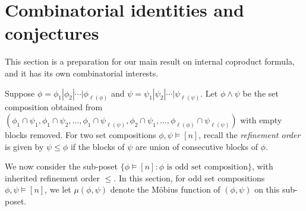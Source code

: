\documentclass[11pt]{amsart}
\newtheorem{Theorem}{Theorem}[section]
\newtheorem{Lemma}[Theorem]{Lemma}
\numberwithin{equation}{section}
\newcommand{\NCSym}{\mathrm{NCSym}}
\begin{document}
%
%

\section{Combinatorial identities and conjectures}\label{Sec:combid}

This section is a preparation for our main result on internal coproduct formula, and it has its own combinatorial interests.

Suppose $\phi=\phi_1|\phi_2|\cdots|\phi_{\ell(\phi)}$ and $\psi=\psi_1|\psi_2|\cdots|\psi_{\ell(\psi)}$. Let $\phi\land\psi$ be the set composition obtained from $(\phi_1\cap \psi_1,\phi_1\cap \psi_2,\dots,\phi_1\cap \psi_{\ell(\psi)},\phi_2\cap \psi_1,\dots,\phi_{\ell(\phi)}\cap \psi_{\ell(\psi)})$ with empty blocks removed.
For two set compositions $\phi,\psi\models[n]$, recall the \emph{refinement order} is given by $\psi\leq\phi$ if the blocks of $\psi$ are union of consecutive blocks of $\phi$.




%
%

We now consider the sub-poset $\{\phi\models[n]:\phi\text{ is odd set composition}\}$, with inherited refinement order $\leq$. In this section, for odd set compositions $\phi,\psi\models[n]$, we let $\mu(\phi,\psi)$ denote the M\"{o}bius function of $(\phi,\psi)$ on this sub-poset.
\end{document}
